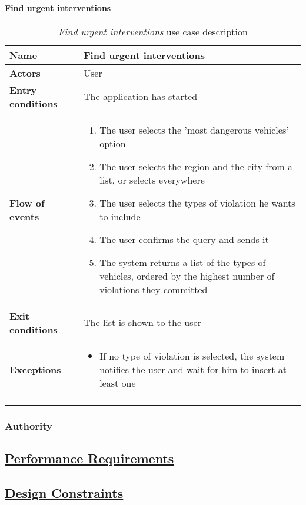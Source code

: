 		\paragraph{Find urgent interventions}
		\begin{longtable}{p{0.25\linewidth}p{0.75\linewidth}}
			\toprule
			\textbf{Name} & \textbf{Find urgent interventions} \\
			\midrule
			\textbf{Actors} & User \\
			\midrule
			\textbf{Entry conditions} & The application has started \\
			\midrule
			\textbf{Flow of events} & 
			\begin{enumerate}
				\item The user selects the 'most dangerous vehicles' option
				\item The user selects the region and the city from a list, or selects everywhere
				\item The user selects the types of violation he wants to include
				\item The user confirms the query and sends it
				\item The system returns a list of the types of vehicles, ordered by the highest number of violations they committed
			\end{enumerate} \\
			\midrule
			\textbf{Exit conditions} & The list is shown to the user\\
			\midrule
			\textbf{Exceptions} & 
			\begin{itemize}
				\item 	If no type of violation is selected, the system notifies the user and wait for him to insert at least one	
			\end{itemize} \\
			\bottomrule
			\caption{\emph{Find urgent interventions} use case description}
		\end{longtable}
		
	\subsubsection{Authority}
	
	
\subsection[Performance Requirements]{\hyperlink{toc}{Performance Requirements}}

\subsection[Design Constraints]{\hyperlink{toc}{Design Constraints}}
